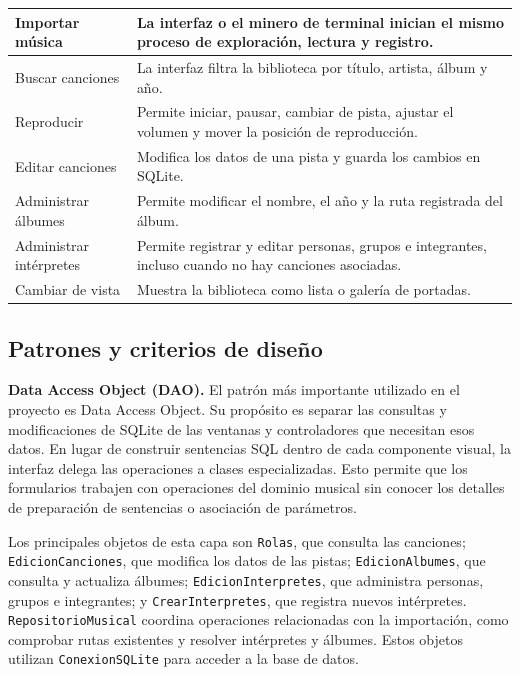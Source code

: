 \documentclass[10pt,a4paper]{article}
\begin{document}
\begin{table}[H]
    \centering
    \begin{tabular}{|p{3.6cm}|p{10.4cm}|}
        \hline
        Importar música & La interfaz o el minero de terminal inician el mismo proceso de exploración, lectura y registro. \\ \hline
        Buscar canciones & La interfaz filtra la biblioteca por título, artista, álbum y año. \\ \hline
        Reproducir & Permite iniciar, pausar, cambiar de pista, ajustar el volumen y mover la posición de reproducción. \\ \hline
        Editar canciones & Modifica los datos de una pista y guarda los cambios en SQLite. \\ \hline
        Administrar álbumes & Permite modificar el nombre, el año y la ruta registrada del álbum. \\ \hline
        Administrar intérpretes & Permite registrar y editar personas, grupos e integrantes, incluso cuando no hay canciones asociadas. \\ \hline
        Cambiar de vista & Muestra la biblioteca como lista o galería de portadas. \\ \hline
    \end{tabular}
\end{table}

\subsection{Patrones y criterios de diseño}

\textbf{Data Access Object (DAO).} El patrón más importante utilizado en el proyecto es Data Access Object. Su propósito es separar las consultas y modificaciones de SQLite de las ventanas y controladores que necesitan esos datos. En lugar de construir sentencias SQL dentro de cada componente visual, la interfaz delega las operaciones a clases especializadas. Esto permite que los formularios trabajen con operaciones del dominio musical sin conocer los detalles de preparación de sentencias o asociación de parámetros.

Los principales objetos de esta capa son \texttt{Rolas}, que consulta las canciones; \texttt{EdicionCanciones}, que modifica los datos de las pistas; \texttt{EdicionAlbumes}, que consulta y actualiza álbumes; \texttt{EdicionInterpretes}, que administra personas, grupos e integrantes; y \texttt{CrearInterpretes}, que registra nuevos intérpretes. \texttt{RepositorioMusical} coordina operaciones relacionadas con la importación, como comprobar rutas existentes y resolver intérpretes y álbumes. Estos objetos utilizan \texttt{ConexionSQLite} para acceder a la base de datos.
\end{document}
